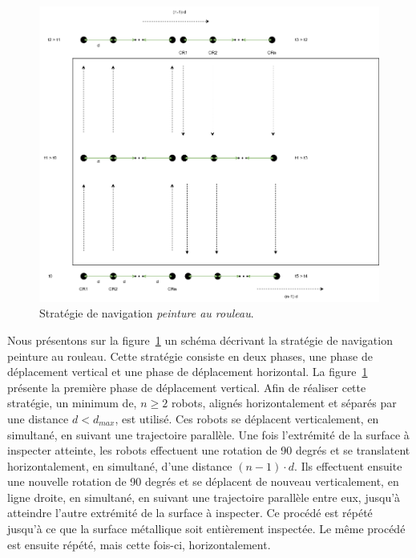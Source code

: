 \documentclass[francais,RandD]{rapportPFE}
\begin{document}
				\begin{figure}[h!]
					\centering
					\includegraphics[scale=0.5]{graphics/peinture_au_rouleau.png}
					\caption{Stratégie de navigation \textit{peinture au rouleau}.}
					\label{fig:peinture_au_rouleau}
				\end{figure}

				Nous présentons sur la figure~\ref{fig:peinture_au_rouleau} un schéma décrivant la stratégie de navigation peinture au rouleau.
				Cette stratégie consiste en deux phases, une phase de déplacement vertical et une phase de déplacement horizontal.
				La figure~\ref{fig:peinture_au_rouleau} présente la première phase de déplacement vertical.
				Afin de réaliser cette stratégie, un minimum de, $n \ge 2$ robots, alignés horizontalement et séparés par une distance $d < d_{max}$, est utilisé.
				Ces robots se déplacent verticalement, en simultané, en suivant une trajectoire parallèle.
				Une fois l'extrémité de la surface à inspecter atteinte, les robots effectuent une rotation de 90 degrés et se translatent horizontalement, en simultané, d'une distance $(n - 1) \cdot d$.
				Ils effectuent ensuite une nouvelle rotation de 90 degrés et se déplacent de nouveau verticalement, en ligne droite, en simultané, en suivant une trajectoire parallèle entre eux, jusqu'à atteindre l'autre extrémité de la surface à inspecter.
				Ce procédé est répété jusqu'à ce que la surface métallique soit entièrement inspectée.
				Le même procédé est ensuite répété, mais cette fois-ci, horizontalement.
\end{document}
